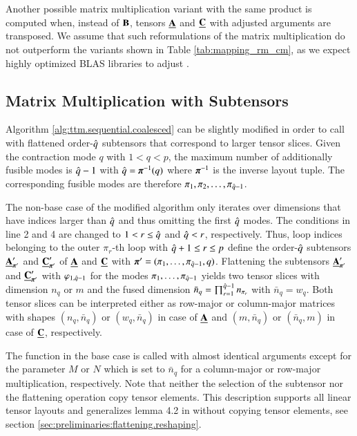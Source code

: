 Another possible matrix multiplication variant with the same product is computed when, instead of $\mathbf{B}$, tensors $\underline{\mathbf{A}}$ and $\underline{\mathbf{C}}$ with adjusted arguments are transposed.
We assume that such reformulations of the matrix multiplication do not outperform the variants shown in Table \ref{tab:mapping_rm_cm}, as we expect highly optimized BLAS libraries to adjust .


\subsection{Matrix Multiplication with Subtensors}
\label{sec:design:blas.based.algorithm.subtensors}
Algorithm \ref{alg:ttm.sequential.coalesced} can be slightly modified in order to call  with flattened order-$\hat{q}$ subtensors that correspond to larger tensor slices.
Given the contraction mode $q$ with $1 < q < p$, the maximum number of additionally fusible modes is $\hat{q}-1$ with $\hat{q} = \boldsymbol{\pi}^{-1}(q)$ where $\boldsymbol{\pi}^{-1}$ is the inverse layout tuple.
The corresponding fusible modes are therefore $\pi_1,\pi_2,\dots,\pi_{\hat{q}-1}$.

The non-base case of the modified algorithm only iterates over dimensions that have indices larger than $\hat{q}$ and thus omitting the first $\hat{q}$ modes.
The conditions in line 2 and 4 are changed to $1 < r \leq \hat{q}$ and $\hat{q} < r$, respectively.
Thus, loop indices belonging to the outer $\pi_r$-th loop with $\hat{q}+1 \leq r \leq p$ define the order-$\hat{q}$ subtensors $\underline{\mathbf{A}}_{\boldsymbol{\pi}'}'$ and $\underline{\mathbf{C}}_{\boldsymbol{\pi}'}'$ of $\underline{\mathbf{A}}$ and $\underline{\mathbf{C}}$ with $\boldsymbol{\pi}' = (\pi_1,\dots,\pi_{\hat{q}-1},q)$.
Flattening the subtensors $\underline{\mathbf{A}}_{\boldsymbol{\pi}'}'$ and $\underline{\mathbf{C}}_{\boldsymbol{\pi}'}'$ with $\varphi_{1,\hat{q}-1}$ for the modes $\pi_1,\dots,\pi_{\hat{q}-1}$ yields two tensor slices with dimension $n_q$ or $m$ and the fused dimension $\bar{n}_q = \prod_{r=1}^{\hat{q}-1} n_{\pi_r}$ with $\bar{n}_q = w_q$.
Both tensor slices can be interpreted either as row-major or column-major matrices with shapes $(n_q,\bar{n}_q)$ or $(w_q,\bar{n}_q)$ in case of $\underline{\mathbf{A}}$ and $(m,\bar{n}_q)$ or $(\bar{n}_q,m)$ in case of $\underline{\mathbf{C}}$, respectively.

The  function in the base case is called with almost identical arguments except for the parameter $M$ or $N$ which is set to $\bar{n}_q$ for a column-major or row-major multiplication, respectively.
Note that neither the selection of the subtensor nor the flattening operation copy tensor elements.
This description supports all linear tensor layouts and generalizes lemma 4.2 in \cite{li:2015:input} without copying tensor elements, see section \ref{sec:preliminaries:flattening.reshaping}.

